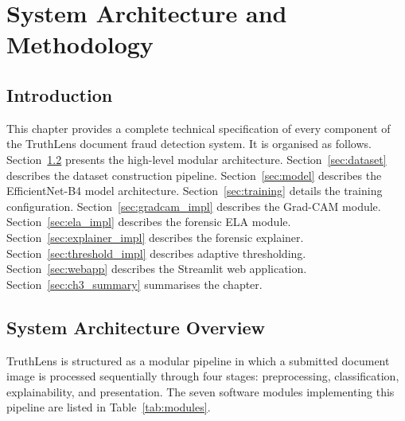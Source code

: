 \documentclass[12pt,a4paper,oneside]{report}
\begin{document}
\chapter{System Architecture and Methodology}
\label{chap:methodology}

\section{Introduction}

This chapter provides a complete technical specification of every component
of the TruthLens document fraud detection system. It is organised as follows.
Section~\ref{sec:arch_overview} presents the high-level modular architecture.
Section~\ref{sec:dataset} describes the dataset construction pipeline.
Section~\ref{sec:model} describes the EfficientNet-B4 model architecture.
Section~\ref{sec:training} details the training configuration.
Section~\ref{sec:gradcam_impl} describes the Grad-CAM module.
Section~\ref{sec:ela_impl} describes the forensic ELA module.
Section~\ref{sec:explainer_impl} describes the forensic explainer.
Section~\ref{sec:threshold_impl} describes adaptive thresholding.
Section~\ref{sec:webapp} describes the Streamlit web application.
Section~\ref{sec:ch3_summary} summarises the chapter.

\section{System Architecture Overview}
\label{sec:arch_overview}

TruthLens is structured as a modular pipeline in which a submitted document
image is processed sequentially through four stages: preprocessing,
classification, explainability, and presentation. The seven software modules
implementing this pipeline are listed in Table~\ref{tab:modules}.
\end{document}
